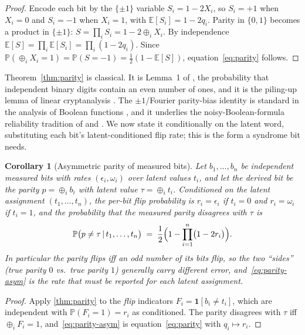 \documentclass[11pt]{article}
\numberwithin{equation}{section}
\theoremstyle{plain}
\newtheorem{corollary}[theorem]{Corollary}
\theoremstyle{definition}
\theoremstyle{remark}
\newcommand{\eps}{\epsilon}
\newcommand{\Prob}{\mathbb{P}}
\newcommand{\Ind}[1]{\mathbf{1}\!\left[#1\right]}
\newcommand{\given}{\,\vert\,}
\newcommand{\bits}{\{0,1\}}
\newcommand{\bxor}{\oplus}
\begin{document}
\begin{proof}
Encode each bit by the $\{\pm1\}$ variable $S_i=1-2X_i$, so $S_i=+1$ when
$X_i=0$ and $S_i=-1$ when $X_i=1$, with $\mathbb{E}[S_i]=1-2q_i$. Parity in
$\bits$ becomes a product in $\{\pm1\}$: $S=\prod_i S_i = 1-2\bxor_i X_i$. By
independence $\mathbb{E}[S]=\prod_i\mathbb{E}[S_i]=\prod_i(1-2q_i)$. Since
$\Prob(\bxor_i X_i=1)=\Prob(S=-1)=\tfrac12(1-\mathbb{E}[S])$,
equation~\eqref{eq:parity} follows.
\end{proof}

Theorem~\ref{thm:parity} is classical. It is Lemma~1 of
\citet{gallager1962ldpc}, the probability that independent binary digits
contain an even number of ones, and it is the piling-up lemma of linear
cryptanalysis \citep{matsui1993linear}. The $\pm1$/Fourier parity-bias identity
is standard in the analysis of Boolean functions \citep{odonnell2014}, and it
underlies the noisy-Boolean-formula reliability tradition of
\citet{vonneumann1956} and \citet{pippenger1988}. We now state it conditionally
on the latent word, substituting each bit's latent-conditioned flip rate; this
is the form a syndrome bit needs.

\begin{corollary}[Asymmetric parity of measured bits]
\label{cor:parity-asym}
Let $b_1,\dots,b_n$ be independent measured bits with rates $(\eps_i,\omega_i)$
over latent values $t_i$, and let the derived bit be the parity
$p=\bxor_i b_i$ with latent value $\tau=\bxor_i t_i$. Conditioned on the latent
assignment $(t_1,\dots,t_n)$, the per-bit flip probability is $r_i=\eps_i$ if
$t_i=0$ and $r_i=\omega_i$ if $t_i=1$, and the probability that the measured
parity disagrees with $\tau$ is
\begin{equation}
\label{eq:parity-asym}
  \Prob\bigl(p \neq \tau \given t_1,\dots,t_n\bigr)
  \;=\; \frac12\Bigl(1 - \prod_{i=1}^{n}\bigl(1-2r_i\bigr)\Bigr).
\end{equation}
In particular the parity flips iff an \emph{odd} number of its bits flip, so the
two ``sides'' (true parity $0$ vs.\ true parity $1$) generally carry different
error, and~\eqref{eq:parity-asym} is the rate that must be reported for each
latent assignment.
\end{corollary}

\begin{proof}
Apply \cref{thm:parity} to the \emph{flip} indicators $F_i=\Ind{b_i\neq t_i}$,
which are independent with $\Prob(F_i=1)=r_i$ as conditioned. The parity disagrees
with $\tau$ iff $\bxor_i F_i=1$, and~\eqref{eq:parity-asym} is
equation~\eqref{eq:parity} with $q_i\mapsto r_i$.
\end{proof}
\end{document}
